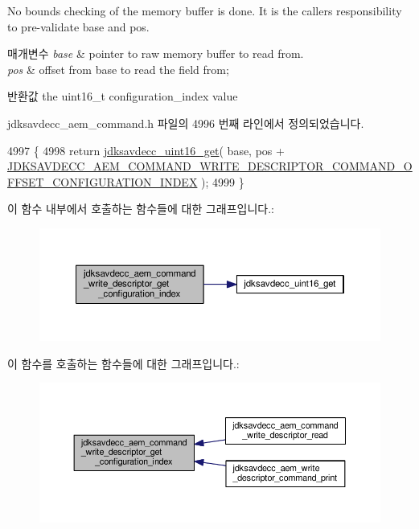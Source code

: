 No bounds checking of the memory buffer is done. It is the caller\textquotesingle{}s responsibility to pre-\/validate base and pos.


\begin{DoxyParams}{매개변수}
{\em base} & pointer to raw memory buffer to read from. \\
\hline
{\em pos} & offset from base to read the field from; \\
\hline
\end{DoxyParams}
\begin{DoxyReturn}{반환값}
the uint16\+\_\+t configuration\+\_\+index value 
\end{DoxyReturn}


jdksavdecc\+\_\+aem\+\_\+command.\+h 파일의 4996 번째 라인에서 정의되었습니다.


\begin{DoxyCode}
4997 \{
4998     \textcolor{keywordflow}{return} \hyperlink{group__endian_ga3fbbbc20be954aa61e039872965b0dc9}{jdksavdecc\_uint16\_get}( base, pos + 
      \hyperlink{group__command__write__descriptor_ga9b4781033fccecd5ad99f94c5a2255c7}{JDKSAVDECC\_AEM\_COMMAND\_WRITE\_DESCRIPTOR\_COMMAND\_OFFSET\_CONFIGURATION\_INDEX}
       );
4999 \}
\end{DoxyCode}


이 함수 내부에서 호출하는 함수들에 대한 그래프입니다.\+:
\nopagebreak
\begin{figure}[H]
\begin{center}
\leavevmode
\includegraphics[width=350pt]{group__command__write__descriptor_gaacd8df9d64b3dd0b9a0453d67251fb2e_cgraph}
\end{center}
\end{figure}




이 함수를 호출하는 함수들에 대한 그래프입니다.\+:
\nopagebreak
\begin{figure}[H]
\begin{center}
\leavevmode
\includegraphics[width=350pt]{group__command__write__descriptor_gaacd8df9d64b3dd0b9a0453d67251fb2e_icgraph}
\end{center}
\end{figure}


